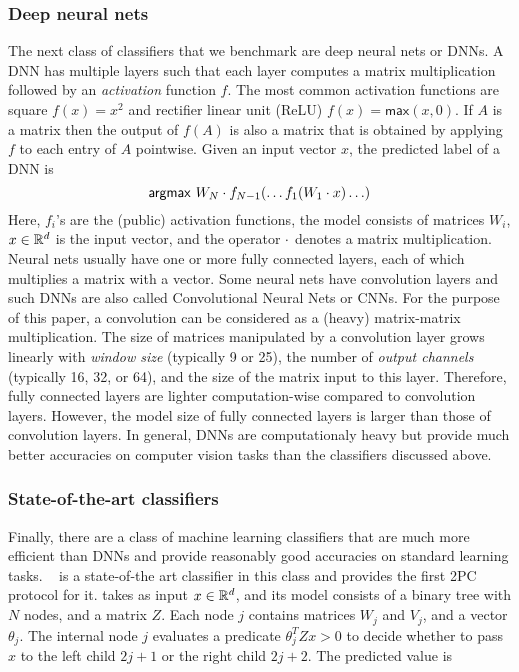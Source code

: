 \subsubsection*{Deep neural nets}
The next class of classifiers that we benchmark are deep neural nets
or DNNs. A DNN has multiple layers such that each layer computes a
matrix
multiplication followed by an {\it activation} function $f$. The most
common activation functions are square $f(x)=x^2$ and rectifier linear
unit (ReLU) $f(x)=\mathsf{max}(x,0)$.
If $A$ is a matrix then the output of $f(A)$ is also a matrix that is
obtained by applying $f$ to each entry of $A$ pointwise.
Given an input vector $x$, the predicted label of a DNN is
\[
 \mathsf{argmax}\ W_N\cdot f_{N-1}(\ldots f_1(W_1\cdot x)\ldots)
\]
Here, $f_i$'s are the (public) activation functions, the model
consists of matrices $W_i$,  $x \in {\mathbb{R}}^d$ is the input vector, and the
operator $\cdot$ denotes a matrix multiplication.
Neural nets usually have one or more fully connected layers, each of
which multiplies a matrix with a vector.
Some neural nets have convolution layers and such DNNs are also called
Convolutional Neural Nets or CNNs.
For the purpose of this paper, a convolution can be considered as a
(heavy) matrix-matrix multiplication. The size of matrices manipulated
by a convolution layer grows linearly with {\it window size}
(typically 9 or 25), the number of {\it output channels} (typically
16, 32, or 64), and the size of the matrix input to this layer.
Therefore, fully connected layers are lighter computation-wise compared
to convolution layers. However, the model size  of fully connected
layers is larger than those of convolution layers.
In general, DNNs are computationaly heavy but provide
much better accuracies on computer vision tasks than the classifiers
discussed above.

\subsubsection*{State-of-the-art classifiers}
Finally, there are a class of machine learning classifiers that are
much more efficient than
DNNs and provide reasonably good accuracies on standard learning
tasks. \bonsai~\cite{bonsai} is a state-of-the art classifier in this
class and \tool provides the first 2PC protocol for it.
\bonsai takes as input $x \in {\mathbb{R}}^d$, and its model consists of a
binary tree with $N$ nodes, and a matrix $Z$. Each node $j$ contains
matrices $W_j$ and $V_j$, and a vector $\theta_{j}$. The internal node
$j$  evaluates a predicate $\theta_j^TZx > 0$ to decide whether
to pass $x$ to the left child $2j+1$ or the right child $2j+2$.
The predicted value is

